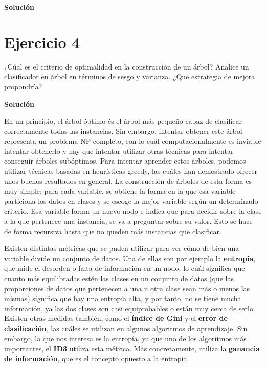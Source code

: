 \documentclass[11pt,a4paper]{article}
\newcommand{\answer}{\noindent\textbf{Solución}}
\newcommand{\addtoc}[1]{\addcontentsline{toc}{section}{#1}}
\begin{document}
\answer



\section*{Ejercicio 4}
\addtoc{Ejercicio 4}

\noindent ¿Cúal es el criterio de optimalidad en la construcción de un árbol? Analice un clasificador
en árbol en términos de sesgo y varianza. ¿Que estrategia de mejora propondría?

\answer

En un principio, el árbol óptimo és el árbol más pequeño capaz de clasificar correctamente todas las instancias. Sin embargo,
intentar obtener este árbol representa un problema NP-completo, con lo cuál computacionalmente es inviable intentar obtenerlo
y hay que intentar utilizar otras técnicas para intentar conseguir árboles subóptimos. Para intentar aprender estos árboles,
podemos utilizar técnicas basadas en heurísticas greedy, las cuáles han demostrado ofrecer unos buenos resultados en general.
La construcción de árboles de esta forma es muy simple: para cada variable, se obtiene la forma en la que esa variable particiona
los datos en clases y se escoge la mejor variable según un determinado criterio. Esa variable forma un nuevo nodo e indica que para
decidir sobre la clase a la que pertenece una instancia, se va a preguntar sobre su valor. Esto se hace de forma recursiva hasta que
no queden más instancias que clasificar.

Existen distintas métricas que se puden utilizar para ver cómo de bien una variable divide un conjunto de datos. Una de ellas
son por ejemplo la \textbf{entropía}, que mide el desorden o falta de información en un nodo, lo cuál significa que cuanto más
equilibradas estén las clases en un conjunto de datos (que las proporciones de datos que pertenecen a una u otra clase sean más o
menos las mismas) significa que hay una entropía alta, y por tanto, no se tiene mucha información, ya las dos clases son casi
equiprobables o están muy cerca de serlo. Existen otras medidas también, como el \textbf{índice de Gini} y el \textbf{error de
clasificación}, las cuáles se utilizan en algunos algoritmos de aprendizaje. Sin embargo, la que nos interesa es la entropía,
ya que uno de los algoritmos más importantes, el \textbf{ID3} utiliza esta métrica. Más concretamente, utiliza la \textbf{ganancia
de información}, que es el concepto opuesto a la entropía.
\end{document}
